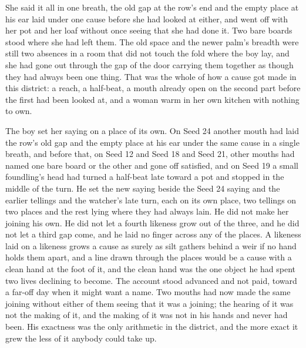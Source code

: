 She said it all in one breath, the old gap at the row's end and the empty place at his ear laid under one cause before she had looked at either, and went off with her pot and her loaf without once seeing that she had done it. Two bare boards stood where she had left them. The old space and the newer palm's breadth were still two absences in a room that did not touch the fold where the boy lay, and she had gone out through the gap of the door carrying them together as though they had always been one thing. That was the whole of how a cause got made in this district: a reach, a half-beat, a mouth already open on the second part before the first had been looked at, and a woman warm in her own kitchen with nothing to own.

The boy set her saying on a place of its own. On Seed 24 another mouth had laid the row's old gap and the empty place at his ear under the same cause in a single breath, and before that, on Seed 12 and Seed 18 and Seed 21, other mouths had named one bare board or the other and gone off satisfied, and on Seed 19 a small foundling's head had turned a half-beat late toward a pot and stopped in the middle of the turn. He set the new saying beside the Seed 24 saying and the earlier tellings and the watcher's late turn, each on its own place, two tellings on two places and the rest lying where they had always lain. He did not make her joining his own. He did not let a fourth likeness grow out of the three, and he did not let a third gap come, and he laid no finger across any of the places. A likeness laid on a likeness grows a cause as surely as silt gathers behind a weir if no hand holds them apart, and a line drawn through the places would be a cause with a clean hand at the foot of it, and the clean hand was the one object he had spent two lives declining to become. The account stood advanced and not paid, toward a far-off day when it might want a name. Two mouths had now made the same joining without either of them seeing that it was a joining; the hearing of it was not the making of it, and the making of it was not in his hands and never had been. His exactness was the only arithmetic in the district, and the more exact it grew the less of it anybody could take up.

